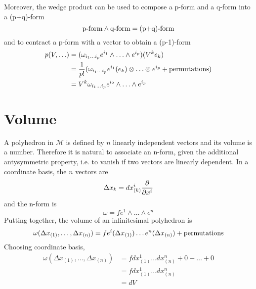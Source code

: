     Moreover, the wedge product can be used to compose a p-form and a q-form into a (p+q)-form
    \begin{equation*}
        \textnormal{p-form} \wedge \textnormal{q-form} = \textnormal{(p+q)-form}
    \end{equation*}
    and to contract a p-form with a vector to obtain a (p-1)-form
    \begin{equation*}
    \begin{aligned}
        p(V, \ldots) & = (\omega_{i_1 \ldots i_p} e^{i_1} \wedge \ldots \wedge e^{i_p}) (V^k e_k) \\ & = \frac{1}{p!} (\omega_{i_1 \ldots i_p} e^{i_1}(e_k) \otimes \ldots \otimes e^{i_p} + \textnormal{permutations}) \\ & = V^k\omega_{i_1 \ldots i_p} e^{i_2} \wedge \ldots \wedge e^{i_p}
    \end{aligned}
    \end{equation*}

\section{Volume}   

    A polyhedron in $\mathcal M$ is defined by $n$ linearly independent vectors and its volume is a number. Therefore it is natural to associate an n-form, given the additional antysymmetric property, i.e. to vanish if two vectors are linearly dependent. In a coordinate basis, the $n$ vectors are
    \begin{equation*}
        \Delta x_k = dx^i_{(k)} \frac{\partial}{\partial x^i}
    \end{equation*}
    and the n-form is 
    \begin{equation*}
        \omega = f e^1 \wedge \ldots \wedge e^n
    \end{equation*}
    Putting together, the volume of an infinitesimal polyhedron is 
    \begin{equation*}
        \omega (\Delta x_{(1)}, \ldots, \Delta x_{(n)}) = f e^i(\Delta x_{(1)}) \ldots e^n(\Delta x_{(n)}) + \textnormal{permutations}
    \end{equation*}
    Choosing coordinate basis, 
    \begin{equation*}
    \begin{aligned}
        \omega (\Delta x_{(1)}, \ldots, \Delta x_{(n)}) & = f dx^1_{(1)} \ldots dx^n_{(n)} + 0 + \ldots + 0 \\ & = f dx^1_{(1)} \ldots dx^n_{(n)} \\ & = dV
    \end{aligned}
    \end{equation*}


